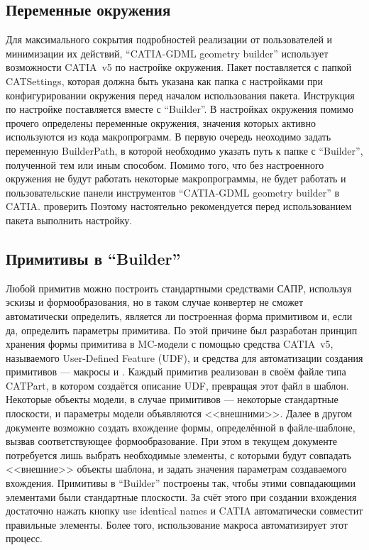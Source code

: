 \subsection{Переменные окружения}\label{sec:BuilderEnv}

Для максимального сокрытия подробностей реализации от пользователей и минимизации их действий, ``CATIA-GDML geometry builder'' использует возможности CATIA~v5 по настройке окружения. Пакет поставляется с папкой CATSettings, которая должна быть указана как папка с настройками при конфигурировании окружения перед началом использования пакета. Инструкция по настройке поставляется вместе с ``Builder''. В настройках окружения помимо прочего определены переменные окружения, значения которых активно используются из кода макропрограмм. В первую очередь неоходимо задать переменную BuilderPath, в которой необходимо указать путь к папке с ``Builder'', полученной тем или иным способом. Помимо того, что без настроенного окружения не будут работать некоторые макропрограммы, не будет работать и пользовательские панели инструментов ``CATIA-GDML geometry builder'' в CATIA. проверить \todo Поэтому настоятельно рекомендуется перед использованием пакета выполнить настройку.

\subsection{Примитивы в ``Builder''}\label{sec:Primitives}

Любой примитив можно построить стандартными средствами САПР, используя эскизы и формообразования, но в таком случае конвертер не сможет автоматически определить, является ли построенная форма примитивом и, если да, определить параметры примитива. По этой причине был разработан принцип хранения формы примитива в MC-модели с помощью средства CATIA~v5, называемого User-Defined Feature (UDF), и средства для автоматизации создания примитивов --- макросы  и . Каждый примитив реализован в своём файле типа CATPart, в котором создаётся описание UDF, превращая этот файл в шаблон. Некоторые объекты модели, в случае примитивов --- некоторые стандартные плоскости, и параметры модели объявляются <<внешними>>. Далее в другом документе возможно создать вхождение формы, определённой в файле-шаблоне, вызвав соответствующее формообразование. При этом в текущем документе потребуется лишь выбрать необходимые элементы, с которыми будут совпадать <<внешние>> объекты шаблона, и задать значения параметрам создаваемого вхождения. Примитивы в ``Builder'' построены так, чтобы этими совпадающими элементами были стандартные плоскости. За счёт этого при создании вхождения достаточно нажать кнопку use identical names и CATIA автоматически совместит правильные элементы. Более того, использование макроса  автоматизирует этот процесс.


